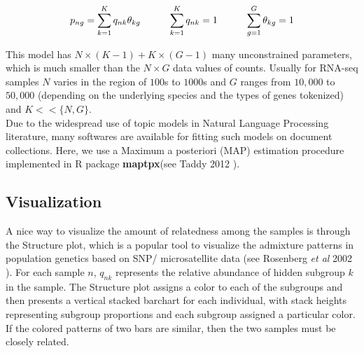 $$ p_{ng} = \sum_{k=1}^{K} q_{nk}\theta_{kg}   \hspace{1 cm}  \sum_{k=1}^{K} q_{nk}=1 \hspace{1 cm} \sum_{g=1}^{G} \theta_{kg}=1 $$

This model has $N \times (K-1) + K \times (G-1)$ many unconstrained parameters, which is much smaller than the $N \times G$  data values of counts. Usually for RNA-seq samples $N$ varies in the region of $100$s to $1000$s  and $G$ ranges from $10,000$ to $50,000$ (depending on the underlying species and the types of genes tokenized) and $K << \{N,G \}$. \\[1 pt]

Due to the widespread use of topic models in Natural Language Processing literature, many softwares are available for fitting such models on document collections. Here, we use a Maximum a posteriori (MAP)  estimation procedure implemented in R package  \textbf{maptpx}(see Taddy 2012 \cite{Taddy2012}).

%
%

\subsection{Visualization}

A nice way to visualize the amount of relatedness among the samples is through the Structure plot, which is a popular tool to visualize the admixture patterns in population genetics based on SNP/ microsatellite data (see Rosenberg \textit{et al} 2002 \cite{Rosenberg2002}).  
For each sample $n$, $q_{nk}$  represents the relative abundance of  hidden subgroup $k$ in the sample. The Structure plot  assigns a color to each of the subgroups and then presents a vertical stacked barchart for each individual, with stack heights representing subgroup proportions and each subgroup assigned a particular color. If the colored patterns of two bars are similar, then the two samples must be closely related.  \\[1 pt]

